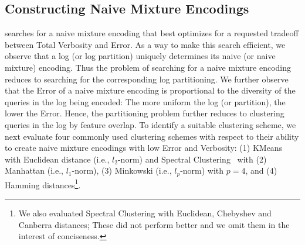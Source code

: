 \subsection{Constructing Naive Mixture Encodings}
\label{sec:constructingnaivemixtureencodings}
\systemname searches for a naive mixture encoding that best optimizes for a requested tradeoff between Total Verbosity and Error.  
As a way to make this search efficient, we observe that a log (or log partition) uniquely determines its naive (or naive mixture) encoding. 
Thus the problem of searching for a naive mixture encoding reduces to searching for the corresponding log partitioning.
We further observe that the Error of a naive mixture encoding is proportional to the diversity of the queries in the log being encoded: 
The more uniform the log (or partition), the lower the Error.
Hence, the partitioning problem further reduces to clustering queries in the log by feature overlap.
To identify a suitable clustering scheme, we next evaluate four commonly used clustering schemes with respect to their ability to create naive mixture encodings with low Error and Verbosity: (1) KMeans~\cite{DBLP:journals/prl/Jain10} with Euclidean distance (i.e., $l_2$-norm) and Spectral Clustering~\cite{DBLP:journals/jacm/KannanVV04} with (2) Manhattan (i.e., $l_1$-norm), (3) Minkowski (i.e., $l_p$-norm) with $p=4$, and (4) Hamming distances\footnote{We also evaluated Spectral Clustering with Euclidean, Chebyshev and Canberra distances; These did not perform better and we omit them in the interest of conciseness.}.
